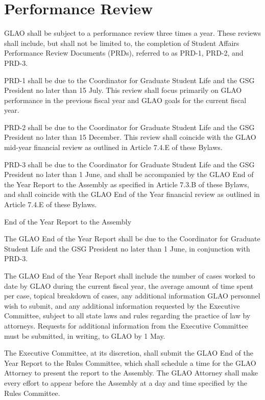 \section{Performance Review}
\begin{bylaws-number}
  \item GLAO shall be subject to a performance review three times a year. These reviews shall include, but shall not be limited to, the completion of Student Affairs Performance Review Documents (PRDs), referred to as PRD-1, PRD-2, and PRD-3.
  \begin{bylaws-number}
    \item PRD-1 shall be due to the Coordinator for Graduate Student Life and the GSG President no later than 15 July. This review shall focus primarily on GLAO performance in the previous fiscal year and GLAO goals for the current fiscal year.
    \item PRD-2 shall be due to the Coordinator for Graduate Student Life and the GSG President no later than 15 December. This review shall coincide with the GLAO mid-year financial review as outlined in Article 7.4.E of these Bylaws.
    \item PRD-3 shall be due to the Coordinator for Graduate Student Life and the GSG President no later than 1 June, and shall be accompanied by the GLAO End of the Year Report to the Assembly as specified in Article 7.3.B of these Bylaws, and shall coincide with the GLAO End of the Year financial review as outlined in Article 7.4.E of these Bylaws.
  \end{bylaws-number}
  \item End of the Year Report to the Assembly
  \begin{bylaws-number}
    \item The GLAO End of the Year Report shall be due to the Coordinator for Graduate Student Life and the GSG President no later than 1 June, in conjunction with PRD-3.
    \item The GLAO End of the Year Report shall include the number of cases worked to date by GLAO during the current fiscal year, the average amount of time spent per case, topical breakdown of cases, any additional information GLAO personnel wish to submit, and any additional information requested by the Executive Committee, subject to all state laws and rules regarding the practice of law by attorneys. Requests for additional information from the Executive Committee must be submitted, in writing, to GLAO by 1 May.
    \item The Executive Committee, at its discretion, shall submit the GLAO End of the Year Report to the Rules Committee, which shall schedule a time for the GLAO Attorney to present the report to the Assembly. The GLAO Attorney shall make every effort to appear before the Assembly at a day and time specified by the Rules Committee.
  \end{bylaws-number}
\end{bylaws-number}

